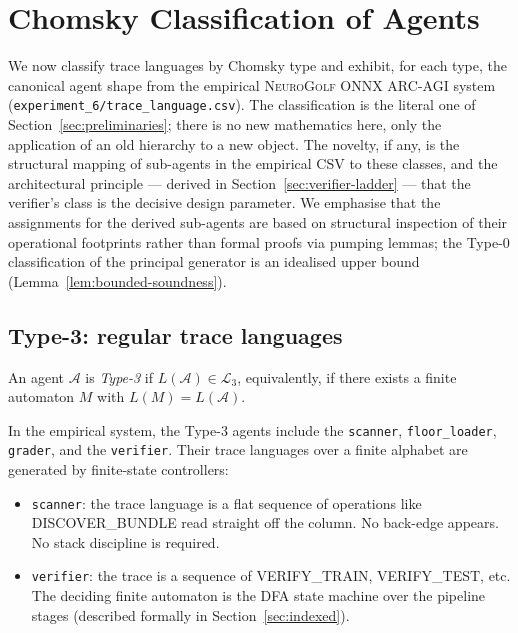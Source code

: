 \section{Chomsky Classification of Agents}
\label{sec:chomsky}
\sloppy
We now classify trace languages by Chomsky type and exhibit, for
each type, the canonical agent shape from the empirical
\textsc{NeuroGolf ONNX ARC-AGI} system
(\texttt{experiment\_6/trace\_language.csv}).  The classification
is the literal one of Section~\ref{sec:preliminaries}; there is no
new mathematics here, only the application of an old hierarchy to a
new object.  The novelty, if any, is the structural mapping of
sub-agents in the empirical CSV to these classes, and the
architectural principle --- derived in
Section~\ref{sec:verifier-ladder} --- that the verifier's class is
the decisive design parameter.  We emphasise that the assignments
for the derived sub-agents are based on structural inspection of
their operational footprints rather than formal proofs via pumping
lemmas; the Type-0 classification of the principal generator is an
idealised upper bound (Lemma~\ref{lem:bounded-soundness}).

\subsection{Type-3: regular trace languages}
\sloppy

\begin{definition}
\label{def:type3agent}
\sloppy
An agent $\mathcal{A}$ is \emph{Type-3} if $L(\mathcal{A}) \in
\mathcal{L}_3$, equivalently, if there exists a finite
automaton $M$ with $L(M) = L(\mathcal{A})$.
\end{definition}

In the empirical system, the Type-3 agents include the
\texttt{scanner}, \texttt{floor\_loader}, \texttt{grader}, and the
\texttt{verifier}. Their trace languages over a finite alphabet
are generated by finite-state controllers:
\begin{itemize}
\item \texttt{scanner}: the trace language is a flat sequence
of operations like \textsf{DISCOVER\_BUNDLE} read straight off
the column. No back-edge appears. No stack discipline is required.
\item \texttt{verifier}: the trace is a sequence of
\textsf{VERIFY\_TRAIN}, \textsf{VERIFY\_TEST}, etc.
The deciding finite automaton is the DFA state machine over the
pipeline stages (described formally in Section~\ref{sec:indexed}).
\end{itemize}

